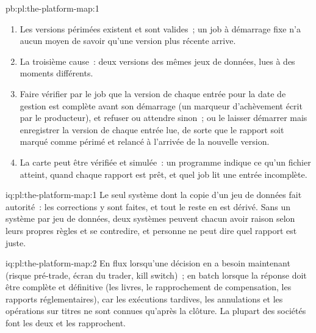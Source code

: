 \begin{solution}{pb:pl:the-platform-map:1}
\begin{enumerate}
fichier des opérations sur titres peut arriver jusqu'à 22~h~35~; un batch de risque lancé à heure fixe à 21~h~00 lit un référentiel des titres périmé et des
positions périmées dès que le fichier arrive après 20~h~15, soit 45 minutes après son heure nominale, alors que lancé sur ses entrées il aurait
terminé à 04~h~15 la nuit de l'accroche.
\item Les versions périmées existent et sont valides~; un job à démarrage fixe n'a aucun moyen de savoir qu'une version plus récente arrive.
\item La troisième cause~: deux versions des mêmes jeux de données, lues à des moments différents.
\item Faire vérifier par le job que la version de chaque entrée pour la date de gestion est complète avant son démarrage (un marqueur d'achèvement
écrit par le producteur), et refuser ou attendre sinon~; ou le laisser démarrer mais enregistrer la version de chaque entrée lue, de sorte que
le rapport soit marqué comme périmé et relancé à l'arrivée de la nouvelle version.
\item La carte peut être vérifiée et simulée~: un programme indique ce qu'un fichier atteint, quand chaque rapport est prêt, et quel job lit une
entrée incomplète.
\end{enumerate}
\end{solution}

\begin{solution}{iq:pl:the-platform-map:1}
Le seul système dont la copie d'un jeu de données fait autorité~: les corrections y sont faites, et tout le reste en est dérivé.
Sans un système par jeu de données, deux systèmes peuvent chacun avoir raison selon leurs propres règles et se contredire, et personne ne peut dire quel rapport est
juste.
\end{solution}

\begin{solution}{iq:pl:the-platform-map:2}
En flux lorsqu'une décision en a besoin maintenant (risque pré-trade, écran du trader, kill switch)~; en batch lorsque la réponse doit être
complète et définitive (les livres, le rapprochement de compensation, les rapports réglementaires), car les exécutions tardives, les annulations et les opérations sur titres
ne sont connues qu'après la clôture. La plupart des sociétés font les deux et les rapprochent.
\end{solution}

